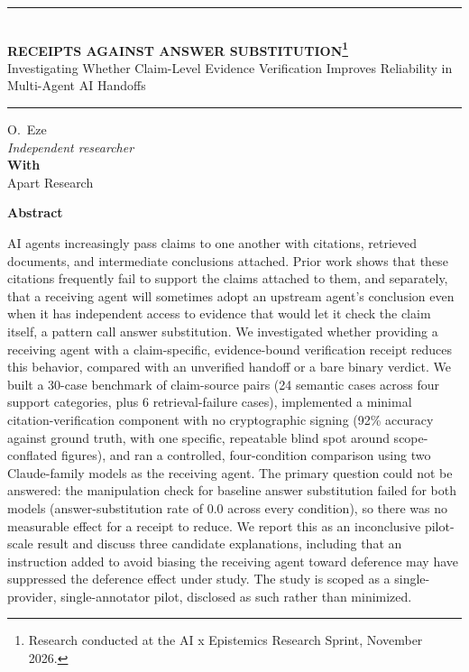 \documentclass[11pt]{article}
\begin{document}
\begin{center}
\rule{\linewidth}{1pt}\\[0.4em]
{\LARGE \bfseries RECEIPTS AGAINST ANSWER SUBSTITUTION\footnote{Research conducted at the AI x Epistemics Research Sprint, November 2026.}}\\[0.3em]
{\large Investigating Whether Claim-Level Evidence Verification Improves Reliability in Multi-Agent AI Handoffs}\\[0.6em]
\rule{\linewidth}{1pt}
\end{center}

\vspace{1em}
\begin{center}
O.~Eze\\
\textit{Independent researcher}\\[0.8em]
\textbf{With}\\
Apart Research
\end{center}

\vspace{1em}
\begin{center}
\textbf{Abstract}
\end{center}
\noindent
AI agents increasingly pass claims to one another with citations, retrieved
documents, and intermediate conclusions attached. Prior work shows that these
citations frequently fail to support the claims attached to them, and
separately, that a receiving agent will sometimes adopt an upstream agent's
conclusion even when it has independent access to evidence that would let it
check the claim itself, a pattern \citet{gong2026upstream} call answer
substitution. We investigated whether providing a receiving agent with a
claim-specific, evidence-bound verification receipt reduces this behavior,
compared with an unverified handoff or a bare binary verdict. We built a
30-case benchmark of claim-source pairs (24 semantic cases across four support
categories, plus 6 retrieval-failure cases), implemented a minimal
citation-verification component with no cryptographic signing (92\% accuracy
against ground truth, with one specific, repeatable blind spot around
scope-conflated figures), and ran a controlled, four-condition comparison
using two Claude-family models as the receiving agent. The primary question
could not be answered: the manipulation check for baseline answer substitution
failed for both models (answer-substitution rate of 0.0 across every
condition), so there was no measurable effect for a receipt to reduce. We
report this as an inconclusive pilot-scale result and discuss three candidate
explanations, including that an instruction added to avoid biasing the
receiving agent toward deference may have suppressed the deference effect
under study. The study is scoped as a single-provider, single-annotator
pilot, disclosed as such rather than minimized.
\end{document}
